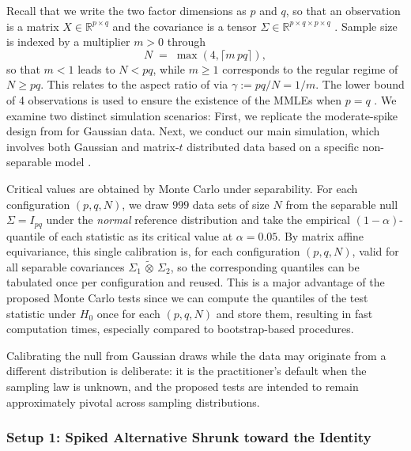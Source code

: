 \documentclass[12pt]{article}
\newcommand{\R}{\mathbb{R}}
\newcommand{\ot}{\,\tilde\otimes\,}
\begin{document}
Recall that we write the two factor dimensions as $p$ and $q$, so that an observation is a matrix $X\in\mathbb{R}^{p\times q}$ and the covariance is a tensor $\Sigma \in \R^{p \times q \times p \times q}$ . Sample size is indexed by a multiplier $m>0$ through
\begin{equation}
  N \;=\; \max(4,\lceil m\,pq \rceil),
  \label{eq:n-mult}
\end{equation}
so that $m<1$ leads to $N<pq$, while $m\ge 1$ corresponds to the regular regime of $N\geq pq$. This relates to the aspect ratio of \citet{sung2026testing} via $\gamma:=pq/N=1/m$. The lower bound of 4 observations is used to ensure the existence of the MMLEs when $p = q$ \citep{soloveychik2016gaussian}. 
We examine two distinct simulation scenarios: First, we replicate the moderate-spike design from \citet{sung2026testing} for Gaussian data. Next, we conduct our main simulation, which involves both Gaussian and matrix-$t$ distributed data based on a specific non-separable model \citep{masak2023separable}.

Critical values are obtained by Monte Carlo under separability. For each configuration $(p,q,N)$, we draw $999$ data sets of size $N$ from the separable null $\Sigma=I_{pq}$ under the \emph{normal} reference distribution and take the empirical $(1-\alpha)$-quantile of each statistic as its critical value at $\alpha=0.05$.
By matrix affine equivariance, this single calibration is, for each configuration $(p,q,N)$, valid for all separable covariances $\Sigma_1 \ot \Sigma_2$, so the corresponding quantiles can be tabulated once per configuration and reused. This is a major advantage of the proposed Monte Carlo tests since we can compute the quantiles of the test statistic under $H_0$ once for each $(p,q,N)$ and store them, resulting in fast computation times, especially compared to bootstrap-based procedures.


Calibrating the null from Gaussian draws while the data may originate from a different distribution is deliberate: it is the practitioner's default when the sampling law is unknown, and the proposed tests are intended to remain approximately pivotal across sampling distributions.




\subsubsection{Setup 1: Spiked Alternative Shrunk toward the Identity}
\label{sec:sim-reproduce}
\end{document}
